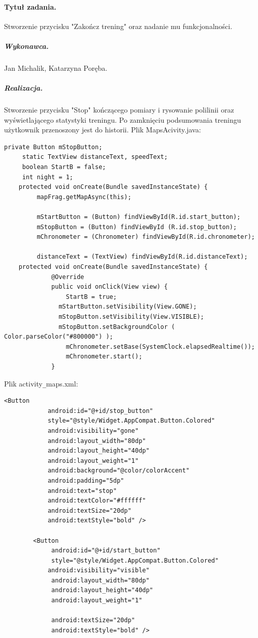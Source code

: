\documentclass[a4paper]{article}
\begin{document}
\paragraph{Tytuł zadania.} Stworzenie przycisku "Zakończ trening" oraz nadanie mu funkcjonalności.
\subparagraph{Wykonawca.} Jan Michalik, Katarzyna Poręba.
\subparagraph{Realizacja.} Stworzenie przycisku "Stop" kończącego pomiary i rysowanie polilinii oraz wyświetlającego statystyki treningu. Po zamknięciu podsumowania treningu użytkownik przenoszony jest do historii.
Plik MapsAcivity.java:
\begin{lstlisting}[style=java]
private Button mStopButton;
     static TextView distanceText, speedText;
     boolean StartB = false;
     int night = 1;
    protected void onCreate(Bundle savedInstanceState) {
         mapFrag.getMapAsync(this);
 
         mStartButton = (Button) findViewById(R.id.start_button);
         mStopButton = (Button) findViewById (R.id.stop_button);
         mChronometer = (Chronometer) findViewById(R.id.chronometer);
 
         distanceText = (TextView) findViewById(R.id.distanceText);
    protected void onCreate(Bundle savedInstanceState) {
             @Override
             public void onClick(View view) {
                 StartB = true;
               mStartButton.setVisibility(View.GONE);
               mStopButton.setVisibility(View.VISIBLE);
               mStopButton.setBackgroundColor ( Color.parseColor("#800000") );
                 mChronometer.setBase(SystemClock.elapsedRealtime());
                 mChronometer.start();
             }
\end{lstlisting}
Plik activity\verb|_|maps.xml:
\begin{lstlisting}[style=xml]
        <Button
            android:id="@+id/stop_button"
            style="@style/Widget.AppCompat.Button.Colored"
            android:visibility="gone"
            android:layout_width="80dp"
            android:layout_height="40dp"
            android:layout_weight="1"
            android:background="@color/colorAccent"
            android:padding="5dp"
            android:text="stop"
            android:textColor="#ffffff"
            android:textSize="20dp"
            android:textStyle="bold" />

        <Button
             android:id="@+id/start_button"
             style="@style/Widget.AppCompat.Button.Colored"
            android:visibility="visible"
             android:layout_width="80dp"
             android:layout_height="40dp"
             android:layout_weight="1"
             
             android:textSize="20dp"
             android:textStyle="bold" />
\end{lstlisting}
\end{document}
